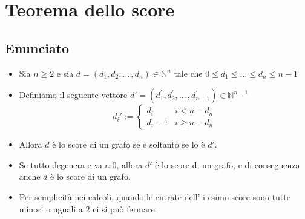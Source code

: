 \documentclass[10pt]{article}
\begin{document}
	\newpage
	\section{Teorema dello score}
	\subsection{Enunciato}
	\begin{itemize}
	\item
	Sia $n \geq 2$ e sia $d = (d_1, d_2, \dotso\,,d_n) \in \mathbb{N}^n$ tale che $0 \leq d_1 \leq \dotso \leq d_n \leq n-1$
	\item
	Definiamo il seguente vettore $d' = (d^{'}_1, d^{'}_2, \dotso\,,d^{'}_{n-1}) \in \mathbb{N}^{n-1}$
	\begin{equation}
	d_{i}' := 
	\begin{cases}
	d_i & i < n-d_n \\
	d_i - 1 & i \geq n-d_n
	\end{cases}
	\end{equation}
	\item
	Allora $d$ è lo score di un grafo se e soltanto se lo è $d'$.
	\item
	Se tutto degenera e va a 0, allora $d'$ è lo score di un grafo, e di conseguenza anche $d$ è lo score di un grafo.
	\item
	Per semplicità nei calcoli, quando le entrate dell' i-esimo score sono tutte minori o uguali a $2$ ci si può fermare.
	\end{itemize}
\end{document}
